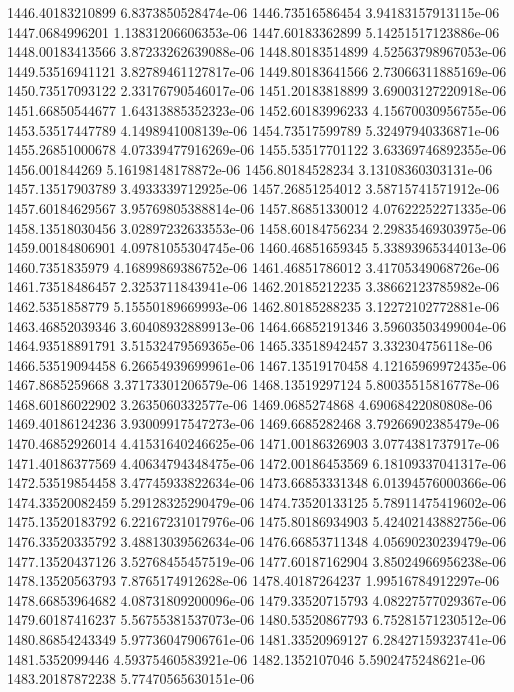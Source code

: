 {1446.40183210899 6.8373850528474e-06
1446.73516586454 3.94183157913115e-06
1447.0684996201 1.13831206606353e-06
1447.60183362899 5.14251517123886e-06
1448.00183413566 3.87233262639088e-06
1448.80183514899 4.52563798967053e-06
1449.53516941121 3.82789461127817e-06
1449.80183641566 2.73066311885169e-06
1450.73517093122 2.33176790546017e-06
1451.20183818899 3.69003127220918e-06
1451.66850544677 1.64313885352323e-06
1452.60183996233 4.15670030956755e-06
1453.53517447789 4.1498941008139e-06
1454.73517599789 5.32497940336871e-06
1455.26851000678 4.07339477916269e-06
1455.53517701122 3.63369746892355e-06
1456.001844269 5.16198148178872e-06
1456.80184528234 3.13108360303131e-06
1457.13517903789 3.4933339712925e-06
1457.26851254012 3.58715741571912e-06
1457.60184629567 3.95769805388814e-06
1457.86851330012 4.07622252271335e-06
1458.13518030456 3.02897232633553e-06
1458.60184756234 2.29835469303975e-06
1459.00184806901 4.09781055304745e-06
1460.46851659345 5.33893965344013e-06
1460.7351835979 4.16899869386752e-06
1461.46851786012 3.41705349068726e-06
1461.73518486457 2.3253711843941e-06
1462.20185212235 3.38662123785982e-06
1462.5351858779 5.15550189669993e-06
1462.80185288235 3.12272102772881e-06
1463.46852039346 3.60408932889913e-06
1464.66852191346 3.59603503499004e-06
1464.93518891791 3.51532479569365e-06
1465.33518942457 3.332304756118e-06
1466.53519094458 6.26654939699961e-06
1467.13519170458 4.12165969972435e-06
1467.8685259668 3.37173301206579e-06
1468.13519297124 5.80035515816778e-06
1468.60186022902 3.2635060332577e-06
1469.0685274868 4.69068422080808e-06
1469.40186124236 3.93009917547273e-06
1469.6685282468 3.79266902385479e-06
1470.46852926014 4.41531640246625e-06
1471.00186326903 3.0774381737917e-06
1471.40186377569 4.40634794348475e-06
1472.00186453569 6.18109337041317e-06
1472.53519854458 3.47745933822634e-06
1473.66853331348 6.01394576000366e-06
1474.33520082459 5.29128325290479e-06
1474.73520133125 5.78911475419602e-06
1475.13520183792 6.22167231017976e-06
1475.80186934903 5.42402143882756e-06
1476.33520335792 3.48813039562634e-06
1476.66853711348 4.05690230239479e-06
1477.13520437126 3.52768455457519e-06
1477.60187162904 3.85024966956238e-06
1478.13520563793 7.8765174912628e-06
1478.40187264237 1.99516784912297e-06
1478.66853964682 4.08731809200096e-06
1479.33520715793 4.08227577029367e-06
1479.60187416237 5.56755381537073e-06
1480.53520867793 6.75281571230512e-06
1480.86854243349 5.97736047906761e-06
1481.33520969127 6.28427159323741e-06
1481.5352099446 4.59375460583921e-06
1482.1352107046 5.5902475248621e-06
1483.20187872238 5.77470565630151e-06
}
